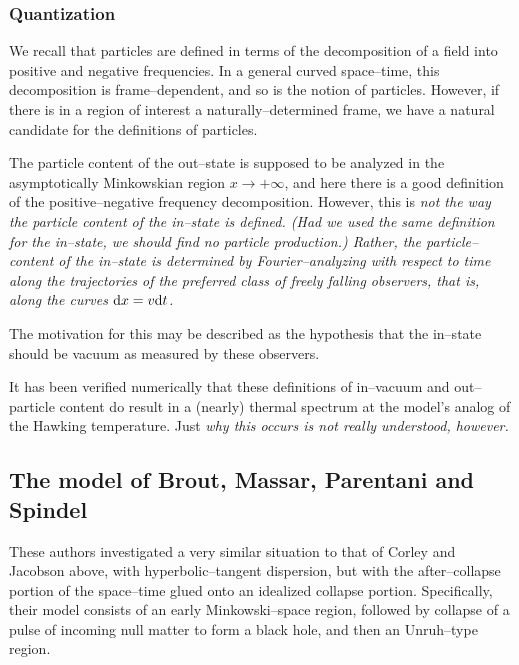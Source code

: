 \subsubsection{Quantization}

We recall that particles are defined in terms of the decomposition of a field
into positive and negative frequencies.  In a general curved space--time, this
decomposition is frame--dependent, and so is the notion of particles.  However,
if there is in a region of interest a naturally--determined frame, we have a
natural candidate for the definitions of particles.

The particle content of the out--state is supposed to be analyzed in the
asymptotically Minkowskian region $x\to +\infty$, and here there is a good
definition of the positive--negative frequency decomposition.  However, this is \it not \rm the way the particle content of the
\it in--state \rm is defined. (Had we used the same definition for the
in--state, we should find no particle production.)  Rather, the
particle--content of the in--state is determined by Fourier--analyzing with
respect to time \it along the trajectories of the preferred class of freely
falling observers, \rm that is, along the curves $\d x =v\d t$.  

The motivation for this may be described as the hypothesis that the in--state
should be vacuum as measured by these observers.

It has been verified numerically that these definitions of in--vacuum and
out--particle content do result in a (nearly) thermal spectrum at the model's
analog of the Hawking temperature.  Just \it why \rm this occurs is not really
understood, however.

\subsection{The model of Brout, Massar, Parentani and Spindel}

These authors investigated a very similar situation to that of Corley and
Jacobson above, with hyperbolic--tangent dispersion, but with the
after--collapse portion of the space--time glued onto an idealized collapse
portion. Specifically, their model consists of an early Minkowski--space
region, followed by collapse of a pulse of incoming null matter to form a black
hole, and then an Unruh--type region.  

